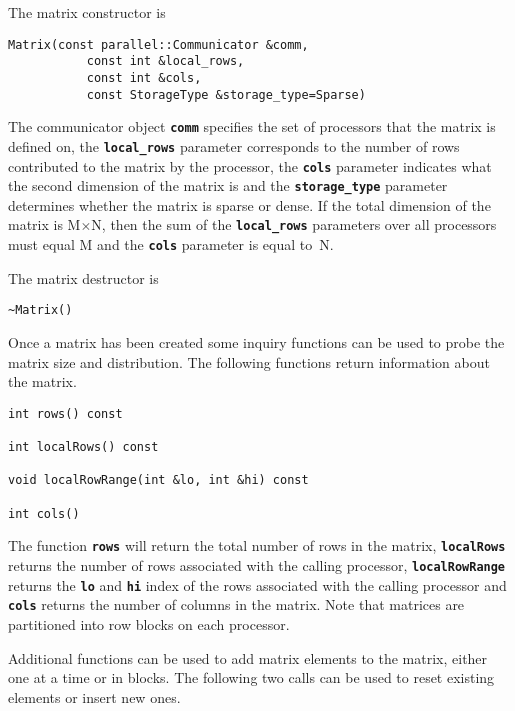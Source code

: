 The matrix constructor is

{
\color{red}
\begin{Verbatim}[fontseries=b]
Matrix(const parallel::Communicator &comm,
           const int &local_rows,
           const int &cols,
           const StorageType &storage_type=Sparse)
\end{Verbatim}
}

The communicator object \texttt{\textbf{comm}} specifies the set of processors that the matrix is defined on, the \texttt{\textbf{local\_rows}} parameter corresponds to the number of rows contributed to the matrix by the processor, the \texttt{\textbf{cols}} parameter indicates what the second dimension of the matrix is and the \texttt{\textbf{storage\_type}} parameter determines whether the matrix is sparse or dense. If the total dimension of the matrix is M$\mathrm{\times}$N, then the sum of the \texttt{\textbf{local\_rows}} parameters over all processors must equal M and the \texttt{\textbf{cols}} parameter is equal to~N. 

The matrix destructor is

{
\color{red}
\begin{Verbatim}[fontseries=b]
~Matrix()
\end{Verbatim}
}

Once a matrix has been created some inquiry functions can be used to probe the matrix size and distribution. The following functions return information about the matrix.

{
\color{red}
\begin{Verbatim}[fontseries=b]
int rows() const

int localRows() const

void localRowRange(int &lo, int &hi) const

int cols()
\end{Verbatim}
}

The function \texttt{\textbf{rows}} will return the total number of rows in the matrix, \texttt{\textbf{localRows}} returns the number of rows associated with the calling processor, \texttt{\textbf{localRowRange}} returns the \texttt{\textbf{lo}} and \texttt{\textbf{hi}} index of the rows associated with the calling processor and \texttt{\textbf{cols}} returns the number of columns in the matrix. Note that matrices are partitioned into row blocks on each processor.

Additional functions can be used to add matrix elements to the matrix, either one at a time or in blocks. The following two calls can be used to reset existing elements or insert new ones.

